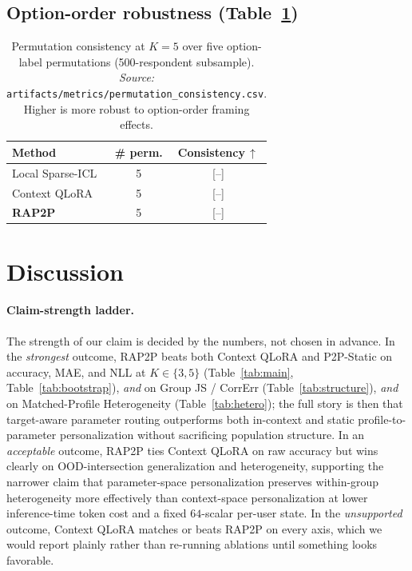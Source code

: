 \documentclass[letterpaper]{article} %
\begin{document}
\subsection{Option-order robustness (Table~\ref{tab:permutation})}
\begin{table}[t]
\centering
\caption{Permutation consistency at $K{=}5$ over five option-label
permutations (500-respondent subsample). \emph{Source:}
\texttt{artifacts/metrics/permutation\_consistency.csv}. Higher is more robust
to option-order framing effects.}
\label{tab:permutation}
\setlength{\tabcolsep}{5pt}
\begin{tabular}{lcc}
\toprule
Method & \# perm. & Consistency\,$\uparrow$ \\
\midrule
Local Sparse-ICL & 5 & [--] \\
Context QLoRA    & 5 & [--] \\
\textbf{RAP2P}   & 5 & [--] \\
\bottomrule
\end{tabular}
\end{table}

\section{Discussion}
\label{sec:discussion}

\paragraph{Claim-strength ladder.}
The strength of our claim is decided by the numbers, not chosen in advance. In
the \emph{strongest} outcome, RAP2P beats both Context QLoRA and P2P-Static on
accuracy, MAE, and NLL at $K\in\{3,5\}$ (Table~\ref{tab:main},
Table~\ref{tab:bootstrap}), \emph{and} on Group JS / CorrErr
(Table~\ref{tab:structure}), \emph{and} on Matched-Profile Heterogeneity
(Table~\ref{tab:hetero}); the full story is then that target-aware parameter
routing outperforms both in-context and static profile-to-parameter
personalization without sacrificing population structure. In an
\emph{acceptable} outcome, RAP2P ties Context QLoRA on raw accuracy but wins
clearly on OOD-intersection generalization and heterogeneity, supporting the
narrower claim that parameter-space personalization preserves within-group
heterogeneity more effectively than context-space personalization at lower
inference-time token cost and a fixed $64$-scalar per-user state. In the
\emph{unsupported} outcome, Context QLoRA matches or beats RAP2P on every axis,
which we would report plainly rather than re-running ablations until something
looks favorable.
\end{document}
